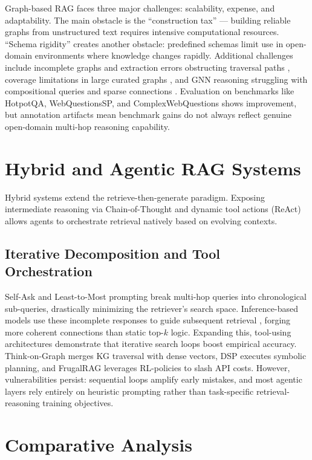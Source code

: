 \documentclass[runningheads]{llncs}
\begin{document}
Graph-based RAG faces three major challenges: scalability, expense, and adaptability. The main obstacle is the ``construction tax'' — building reliable graphs from unstructured text requires intensive computational resources. ``Schema rigidity'' creates another obstacle: predefined schemas limit use in open-domain environments where knowledge changes rapidly. Additional challenges include incomplete graphs and extraction errors obstructing traversal paths \cite{15,59}, coverage limitations in large curated graphs \cite{15,59}, and GNN reasoning struggling with compositional queries and sparse connections \cite{21}. Evaluation on benchmarks like HotpotQA, WebQuestionsSP, and ComplexWebQuestions \cite{28,61,62} shows improvement, but annotation artifacts mean benchmark gains do not always reflect genuine open-domain multi-hop reasoning capability.


\section{Hybrid and Agentic RAG Systems}

Hybrid systems extend the retrieve-then-generate paradigm. Exposing intermediate reasoning via Chain-of-Thought \cite{63} and dynamic tool actions (ReAct) \cite{64} allows agents to orchestrate retrieval natively based on evolving contexts.

\subsection{Iterative Decomposition and Tool Orchestration}

Self-Ask \cite{38} and Least-to-Most prompting \cite{66} break multi-hop queries into chronological sub-queries, drastically minimizing the retriever's search space. Inference-based models use these incomplete responses to guide subsequent retrieval \cite{67,68}, forging more coherent connections than static top-$k$ logic. Expanding this, tool-using architectures \cite{69,86,87,88} demonstrate that iterative search loops boost empirical accuracy. Think-on-Graph \cite{71} merges KG traversal with dense vectors, DSP \cite{72} executes symbolic planning, and FrugalRAG \cite{73} leverages RL-policies to slash API costs. However, vulnerabilities persist: sequential loops amplify early mistakes, and most agentic layers rely entirely on heuristic prompting rather than task-specific retrieval-reasoning training objectives.


\section{Comparative Analysis}
\end{document}
